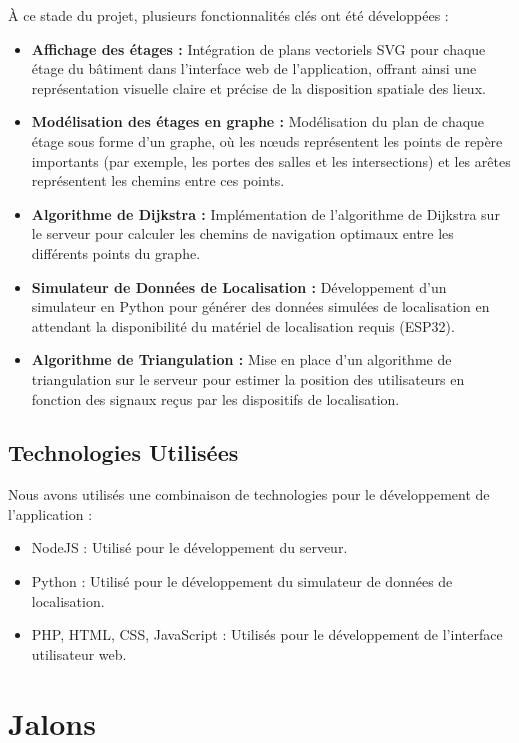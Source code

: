 \documentclass{article}
\begin{document}
À ce stade du projet, plusieurs fonctionnalités clés ont été développées :
\begin{itemize}
    \item \textbf{Affichage des étages :} Intégration de plans vectoriels SVG pour chaque étage du bâtiment dans l'interface web de l'application, offrant ainsi une représentation visuelle claire et précise de la disposition spatiale des lieux.
    \item \textbf{Modélisation des étages en graphe :} Modélisation du plan de chaque étage sous forme d'un graphe, où les nœuds représentent les points de repère importants (par exemple, les portes des salles et les intersections) et les arêtes représentent les chemins entre ces points.
    \item \textbf{Algorithme de Dijkstra :} Implémentation de l'algorithme de Dijkstra sur le serveur pour calculer les chemins de navigation optimaux entre les différents points du graphe.
    \item \textbf{Simulateur de Données de Localisation :} Développement d'un simulateur en Python pour générer des données simulées de localisation en attendant la disponibilité du matériel de localisation requis (ESP32).
    \item \textbf{Algorithme de Triangulation :} Mise en place d'un algorithme de triangulation sur le serveur pour estimer la position des utilisateurs en fonction des signaux reçus par les dispositifs de localisation.
\end{itemize}


\subsection{Technologies Utilisées}

Nous avons utilisés une combinaison de technologies pour le développement de l'application :
\begin{itemize}
    \item NodeJS : Utilisé pour le développement du serveur.
    \item Python : Utilisé pour le développement du simulateur de données de localisation.
    \item PHP, HTML, CSS, JavaScript : Utilisés pour le développement de l'interface utilisateur web.
\end{itemize}

\section{Jalons}
\end{document}
